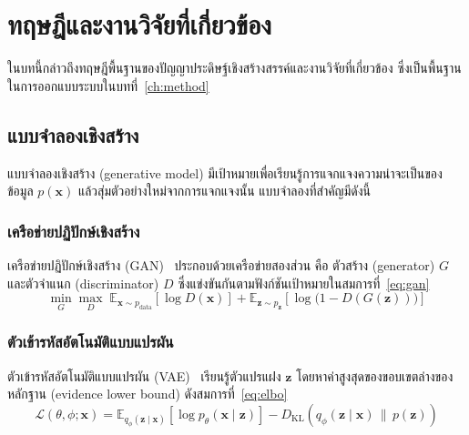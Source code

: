 \chapter{ทฤษฎีและงานวิจัยที่เกี่ยวข้อง}
\label{ch:literature}

ในบทนี้กล่าวถึงทฤษฎีพื้นฐานของปัญญาประดิษฐ์เชิงสร้างสรรค์และงานวิจัยที่เกี่ยวข้อง ซึ่งเป็นพื้นฐานในการออกแบบระบบในบทที่~\ref{ch:method}

\section{แบบจำลองเชิงสร้าง}

แบบจำลองเชิงสร้าง (generative model) มีเป้าหมายเพื่อเรียนรู้การแจกแจงความน่าจะเป็นของข้อมูล $p(\mathbf{x})$ แล้วสุ่มตัวอย่างใหม่จากการแจกแจงนั้น แบบจำลองที่สำคัญมีดังนี้

\subsection{เครือข่ายปฏิปักษ์เชิงสร้าง}

เครือข่ายปฏิปักษ์เชิงสร้าง (GAN)~\cite{goodfellow2014generative} ประกอบด้วยเครือข่ายสองส่วน คือ ตัวสร้าง (generator) $G$ และตัวจำแนก (discriminator) $D$ ซึ่งแข่งขันกันตามฟังก์ชันเป้าหมายในสมการที่~\eqref{eq:gan}
\begin{equation}
  \min_{G}\max_{D}\;
  \mathbb{E}_{\mathbf{x}\sim p_{\text{data}}}\!\left[\log D(\mathbf{x})\right]
  + \mathbb{E}_{\mathbf{z}\sim p_{\mathbf{z}}}\!\left[\log\bigl(1-D(G(\mathbf{z}))\bigr)\right]
  \label{eq:gan}
\end{equation}

\subsection{ตัวเข้ารหัสอัตโนมัติแบบแปรผัน}

ตัวเข้ารหัสอัตโนมัติแบบแปรผัน (VAE)~\cite{kingma2014auto} เรียนรู้ตัวแปรแฝง $\mathbf{z}$ โดยหาค่าสูงสุดของขอบเขตล่างของหลักฐาน (evidence lower bound) ดังสมการที่~\eqref{eq:elbo}
\begin{equation}
  \mathcal{L}(\theta,\phi;\mathbf{x}) =
  \mathbb{E}_{q_\phi(\mathbf{z}\mid\mathbf{x})}\left[\log p_\theta(\mathbf{x}\mid\mathbf{z})\right]
  - D_{\mathrm{KL}}\!\left(q_\phi(\mathbf{z}\mid\mathbf{x})\,\|\,p(\mathbf{z})\right)
  \label{eq:elbo}
\end{equation}

